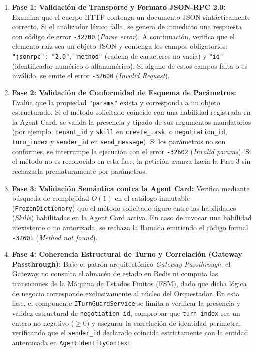 \begin{enumerate}
    \item \textbf{Fase 1: Validación de Transporte y Formato JSON-RPC 2.0:}
    Examina que el cuerpo HTTP contenga un documento JSON sintácticamente correcto. Si el analizador léxico falla, se genera de inmediato una respuesta con código de error \texttt{-32700} (\textit{Parse error}). A continuación, verifica que el elemento raíz sea un objeto JSON y contenga los campos obligatorios: \texttt{"jsonrpc": "2.0"}, \texttt{"method"} (cadena de caracteres no vacía) y \texttt{"id"} (identificador numérico o alfanumérico). Si alguno de estos campos falta o es inválido, se emite el error \texttt{-32600} (\textit{Invalid Request}).

    \item \textbf{Fase 2: Validación de Conformidad de Esquema de Parámetros:}
    Evalúa que la propiedad \texttt{"params"} exista y corresponda a un objeto estructurado. Si el método solicitado coincide con una habilidad registrada en la Agent Card, se valida la presencia y tipado de sus argumentos mandatorios (por ejemplo, \texttt{tenant\_id} y \texttt{skill} en \texttt{create\_task}, o \texttt{negotiation\_id}, \texttt{turn\_index} y \texttt{sender\_id} en \texttt{send\_message}). Si los parámetros no son conformes, se interrumpe la ejecución con el error \texttt{-32602} (\textit{Invalid params}). Si el método no es reconocido en esta fase, la petición avanza hacia la Fase 3 sin rechazarla prematuramente por parámetros.

    \item \textbf{Fase 3: Validación Semántica contra la Agent Card:}
    Verifica mediante búsqueda de complejidad $O(1)$ en el catálogo inmutable (\texttt{FrozenDictionary}) que el método solicitado figure entre las habilidades (\textit{Skills}) habilitadas en la Agent Card activa. En caso de invocar una habilidad inexistente o no autorizada, se rechaza la llamada emitiendo el código formal \texttt{-32601} (\textit{Method not found}).

    \item \textbf{Fase 4: Coherencia Estructural de Turno y Correlación (Gateway Passthrough):}
    Bajo el patrón arquitectónico \textit{Gateway Passthrough}, el Gateway no consulta el almacén de estado en Redis ni computa las transiciones de la Máquina de Estados Finitos (FSM), dado que dicha lógica de negocio corresponde exclusivamente al núcleo del Orquestador. En esta fase, el componente \texttt{ITurnGuardService} se limita a verificar la presencia y validez estructural de \texttt{negotiation\_id}, comprobar que \texttt{turn\_index} sea un entero no negativo ($\ge 0$) y asegurar la correlación de identidad perimetral verificando que el \texttt{sender\_id} declarado coincida estrictamente con la entidad autenticada en \texttt{AgentIdentityContext}.
\end{enumerate}

